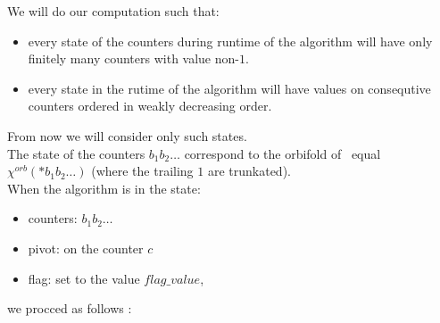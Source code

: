 We will do our computation such that:
\begin{itemize}
\item every state of the counters during runtime of the algorithm will have only finitely many 
counters with value non-$1$. 
\item every state in the rutime of the algorithm 
will have values on consequtive counters ordered in weakly decreasing order.
\end{itemize}
From now we will 
consider only such states. \\
The state of the counters $b_1b_2\dots$ correspond to the orbifold of 
\Eoc\ equal $\chi^{orb}(*b_1b_2\dots)$ (where the trailing $1$ are trunkated). \\ 
When the algorithm is in the state: 
\begin{itemize}
\item counters: $b_1b_2\dots$
\item pivot: on the counter $c$
\item flag: set to the value $flag\_value$,
\end{itemize}
we procced as follows 
:
